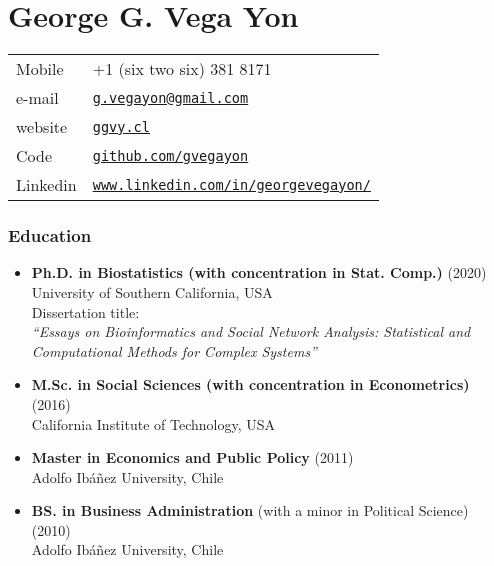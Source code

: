\documentclass[letterpaper, 12pt]{article}
\def\name{George G. Vega Yon}
\begin{document}
\part*{\name}



\begin{minipage}{0.50\linewidth}
  \begin{tabular}{>{}p{.2\linewidth}p{.79\linewidth}}
    Mobile & +1 (six two six) 381 8171 \\
    e-mail & \href{mailto:g.vegayon@gmail.com}{\tt g.vegayon@gmail.com} \\
    website & \href{https://ggvy.cl}{\tt ggvy.cl} \\
    Code & \href{https://github.com/gvegayon}{\tt github.com/gvegayon}\\
    Linkedin & \href{https://www.linkedin.com/in/georgevegayon/}{\tt www.linkedin.com/in/georgevegayon/}
  \end{tabular}
\end{minipage}


\section*{Education}

\begin{itemize}
\item 
{\bf Ph.D. in Biostatistics (with concentration in Stat. Comp.)} (2020)\\
University of Southern California, USA\\
Dissertation title:\\\emph{``Essays on Bioinformatics and Social Network Analysis: Statistical and Computational Methods for Complex Systems''}
\item {\bf M.Sc. in Social Sciences (with concentration in Econometrics)} (2016)\\
California Institute of Technology, USA
\item {\bf Master in Economics and Public Policy} (2011)\\Adolfo Ib\'a\~nez University, Chile 
\item {\bf BS. in Business Administration} (with a minor in Political Science) (2010)\\Adolfo Ib\'a\~nez University, Chile
\end{itemize}
\end{document}
